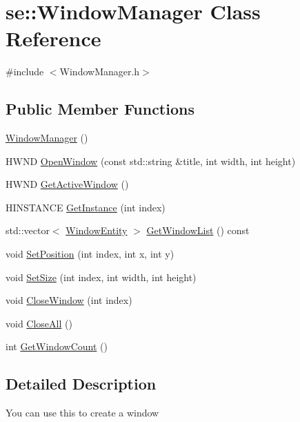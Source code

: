 \hypertarget{classse_1_1_window_manager}{}\section{se\+:\+:Window\+Manager Class Reference}
\label{classse_1_1_window_manager}


{\ttfamily \#include $<$Window\+Manager.\+h$>$}

\subsection*{Public Member Functions}
\begin{DoxyCompactItemize}
\item 
\mbox{\hyperlink{classse_1_1_window_manager_a327899bc3f1f588ce0908f98a36c5b50}{Window\+Manager}} ()
\item 
H\+W\+ND \mbox{\hyperlink{classse_1_1_window_manager_abeae1c064ff6f5b166b10539addd5a53}{Open\+Window}} (const std\+::string \&title, int width, int height)
\item 
H\+W\+ND \mbox{\hyperlink{classse_1_1_window_manager_a8679d9ddb58d3a4a3fba41f2c62ceeec}{Get\+Active\+Window}} ()
\item 
H\+I\+N\+S\+T\+A\+N\+CE \mbox{\hyperlink{classse_1_1_window_manager_a93495e81b13dd081ff4f2c73af58c49c}{Get\+Instance}} (int index)
\item 
std\+::vector$<$ \mbox{\hyperlink{structse_1_1_window_entity}{Window\+Entity}} $>$ \mbox{\hyperlink{classse_1_1_window_manager_a95b009b78fcf4293f9e6bb88985f7803}{Get\+Window\+List}} () const
\item 
void \mbox{\hyperlink{classse_1_1_window_manager_a9cd532f3d16f008eef0d9bec36d521c0}{Set\+Position}} (int index, int x, int y)
\item 
void \mbox{\hyperlink{classse_1_1_window_manager_a19b8aa0bcc7e96aaf2d29c4c9f3044f6}{Set\+Size}} (int index, int width, int height)
\item 
void \mbox{\hyperlink{classse_1_1_window_manager_a9a78ea2e729ff3e8395a1060a16346cd}{Close\+Window}} (int index)
\item 
void \mbox{\hyperlink{classse_1_1_window_manager_ae9106e9a62fa38456da31055f3a663ea}{Close\+All}} ()
\item 
int \mbox{\hyperlink{classse_1_1_window_manager_aec9f7b4a351181abd1a9963a33494614}{Get\+Window\+Count}} ()
\end{DoxyCompactItemize}


\subsection{Detailed Description}
You can use this to create a window 

